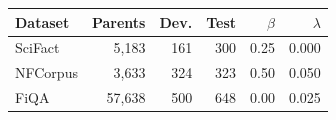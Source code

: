 \begin{tabular}{lrrrrr}
\toprule
Dataset & Parents & Dev. & Test & $\beta$ & $\lambda$\\
\midrule
SciFact & 5,183 & 161 & 300 & 0.25 & 0.000\\
NFCorpus & 3,633 & 324 & 323 & 0.50 & 0.050\\
FiQA & 57,638 & 500 & 648 & 0.00 & 0.025\\
\bottomrule
\end{tabular}
